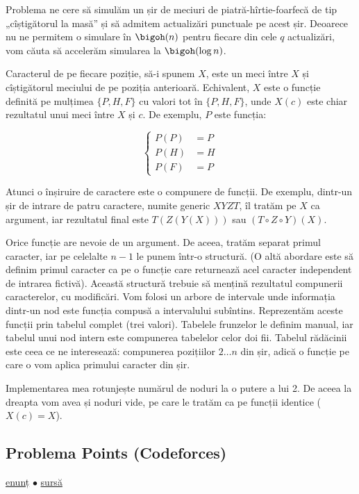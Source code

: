 Problema ne cere să simulăm un șir de meciuri de piatră-hîrtie-foarfecă de tip „cîștigătorul la masă” și să admitem actualizări punctuale pe acest șir. Deoarece nu ne permitem o simulare în $\bigoh(n)$ pentru fiecare din cele $q$ actualizări, vom căuta să accelerăm simularea la $\bigoh(\log n)$.

Caracterul de pe fiecare poziție, să-i spunem $X$, este un meci între $X$ și cîștigătorul meciului de pe poziția anterioară. Echivalent, $X$ este o funcție definită pe mulțimea $\{P, H, F\}$ cu valori tot în $\{P, H, F\}$, unde $X(c)$ este chiar rezultatul unui meci între $X$ și $c$. De exemplu, $P$ este funcția:

$$
\begin{cases}
P(P) & = P \\
P(H) & = H \\
P(F) & = P
\end{cases}
$$

Atunci o înșiruire de caractere este o compunere de funcții. De exemplu, dintr-un șir de intrare de patru caractere, numite generic $XYZT$, îl tratăm pe $X$ ca argument, iar rezultatul final este $T(Z(Y(X)))$ sau $(T \circ Z \circ Y)(X)$.

Orice funcție are nevoie de un argument.  De aceea, tratăm separat primul caracter, iar pe celelalte $n-1$ le punem într-o structură. (O altă abordare este să definim primul caracter ca pe o funcție care returnează acel caracter independent de intrarea fictivă). Această structură trebuie să mențină rezultatul compunerii caracterelor, cu modificări. Vom folosi un arbore de intervale unde informația dintr-un nod este funcția compusă a intervalului subîntins. Reprezentăm aceste funcții prin tabelul complet (trei valori). Tabelele frunzelor le definim manual, iar tabelul unui nod intern este compunerea tabelelor celor doi fii. Tabelul rădăcinii este ceea ce ne interesează: compunerea pozițiilor $2 \dots n$ din șir, adică o funcție pe care o vom aplica primului caracter din șir.

Implementarea mea rotunjește numărul de noduri la o putere a lui 2. De aceea la dreapta vom avea și noduri vide, pe care le tratăm ca pe funcții identice ($X(c) = X$).

\subsection{Problema Points (Codeforces)}
\label{problem:points}

\href{https://codeforces.com/contest/19/problem/D}{enunț}
$\bullet$
\hyperref[code:points]{sursă}

